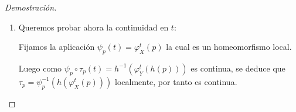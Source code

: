 \begin{proof}[Demostración]
\begin{enumerate}
		Es decir, que si $0<t_2 - t_1< \epsilon  \Rightarrow $
		
		\begin{align*}
			p_1:= \varphi_Y^{t_1}(h(p)) = h\circ \varphi_X^{\tau(p,t_1)}(p) \\
			p_2:= \varphi_Y^{t_2}(h(p)) = h\circ \varphi_X^{\tau(p,t_2)}(p) \\
			\Rightarrow h\circ \varphi_X^{\tau(p_1,t_2-t_1)}(h^{-1}(p_1)) = \varphi_Y^{t_2-t_1}(p_1) = \varphi_Y^{t_2}(h(p))= p_2 		\\
			\Rightarrow h\circ \varphi_X^{\tau(p_1,t_2-t_1)} \circ \varphi_X^{\tau(p,t_1)}(p)  =h\circ \varphi_X^{\tau(p,t_2)}(p)		\\
			\Rightarrow \varphi_X^{\tau(p,t_1) + \tau(p_1,t_2-t_1) } (p)  = \varphi_X^{\tau(p,t_2)}(p)\\
			\Rightarrow \varphi_X^{\tau(p,t_2) - (\tau(p,t_1) + \tau(p_1,t_2-t_1) )} (p)  = p
		\end{align*}
		
		
		Basta designar $t_1, t_2$ cuyas imágenes bajo $\tau$ se ubiquen en el mismo intervalo de definición en órbitas periódicas, mientras que valores arbitrarios son útiles en órbitas no periódicas. De ser así, tenemos que $\tau(p,t_2) - (\tau(p,t_1) + \tau(p_1,t_2-t_1) ) = 0 \Rightarrow \tau(p,t_2) = \tau(p,t_1) + \tau(p_1,t_2-t_1) > \tau(h(p),t_1)$.
		
		Luego la función es estrictamente creciente en un intervalo (caso órbitas periódicas) o en todo el intervalo de definición. 
		
		Para salir del caso del intervalo en órbitas periódicas, asignamos los valores de $\tau_p$ según la extensión a cada intervalo finito. De donde automáticamente por estar en intervalos finitos distintos, los valores de $\tau_p(t_1) < \tau_p(t_2)$ para $t_2$ en un intervalo superior al de $t_1$
		
		
		Es decir, que si las imágenes de $t_1, t_2$ bajo $\tau$ se encuentran en distintas vueltas de una órbita, entonces la monotonicidad está dada inmediatamente
		
		\item Queremos probar ahora la continuidad en $t$:
		
		Fijamos la aplicación $\psi_p (t) = \varphi^t_X(p)$ la cual es un homeomorfismo local.
		
		Luego como $\psi_p \circ \tau_p (t) = h^{-1}(\varphi^t_Y(h(p)))$ es continua, se deduce que $\tau_p = \psi_p^{-1} (h(\varphi^t_X(p))) $ localmente, por tanto es continua.
	\end{enumerate}
\end{proof}

